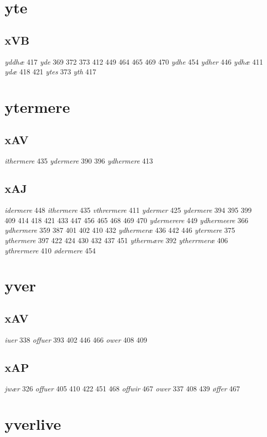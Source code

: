 \documentclass[a4paper,twocolumn]{article}
\begin{document}
\section{yte}
\label{sec:org0f2b94f}
\subsection{xVB}
\label{sec:orgfdd10af}
\emph{yddhæ} 417 \emph{yde} 369 372 373 412 449 464 465 469 470 \emph{ydhe} 454 \emph{ydher} 446 \emph{ydhæ} 411 \emph{ydæ} 418 421 \emph{ytes} 373 \emph{yth} 417 
\section{ytermere}
\label{sec:orgec27fde}
\subsection{xAV}
\label{sec:org9305f24}
\emph{ithermere} 435 \emph{ydermere} 390 396 \emph{ydhermere} 413 
\subsection{xAJ}
\label{sec:org22daddd}
\emph{idermere} 448 \emph{ithermere} 435 \emph{vthrermere} 411 \emph{ydermer} 425 \emph{ydermere} 394 395 399 409 414 418 421 433 447 456 465 468 469 470 \emph{ydermerere} 449 \emph{ydhermeere} 366 \emph{ydhermere} 359 387 401 402 410 432 \emph{ydhermeræ} 436 442 446 \emph{ytermere} 375 \emph{ythermere} 397 422 424 430 432 437 451 \emph{ythermære} 392 \emph{ytherrmeræ} 406 \emph{ythrermere} 410 \emph{ødermere} 454 
\section{yver}
\label{sec:org0c5fb18}
\subsection{xAV}
\label{sec:org3ea785f}
\emph{iuer} 338 \emph{offuer} 393 402 446 466 \emph{ower} 408 409 
\subsection{xAP}
\label{sec:org4d5777c}
\emph{jwær} 326 \emph{offuer} 405 410 422 451 468 \emph{offwir} 467 \emph{ower} 337 408 439 \emph{øffer} 467 
\section{yverlive}
\label{sec:org0dc937c}
\end{document}
